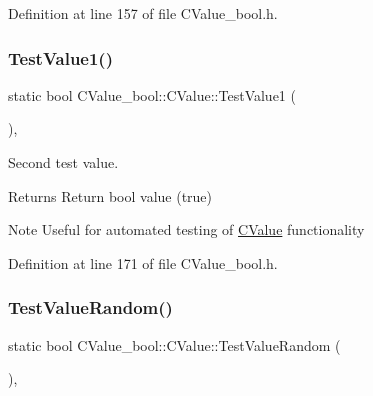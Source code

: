 Definition at line 157 of file C\+Value\+\_\+bool.\+h.

\mbox{\label{class_c_value__bool_1_1_c_value_a73b53a394f0b2ebeebeecad0610949b8}} 
\subsubsection{\texorpdfstring{Test\+Value1()}{TestValue1()}}
{\footnotesize\ttfamily static bool C\+Value\+\_\+bool\+::\+C\+Value\+::\+Test\+Value1 (\begin{DoxyParamCaption}{ }\end{DoxyParamCaption})\hspace{0.3cm}{\ttfamily [inline]}, {\ttfamily [static]}}



Second test value. 

\begin{DoxyReturn}{Returns}
Return {\ttfamily bool} value ({\ttfamily true}) 
\end{DoxyReturn}
\begin{DoxyNote}{Note}
Useful for automated testing of \hyperlink{class_c_value__bool_1_1_c_value}{C\+Value} functionality 
\end{DoxyNote}


Definition at line 171 of file C\+Value\+\_\+bool.\+h.

\mbox{\label{class_c_value__bool_1_1_c_value_a5583585b33adfb3b27d9b49ad1a7cc3a}} 
\subsubsection{\texorpdfstring{Test\+Value\+Random()}{TestValueRandom()}}
{\footnotesize\ttfamily static bool C\+Value\+\_\+bool\+::\+C\+Value\+::\+Test\+Value\+Random (\begin{DoxyParamCaption}{ }\end{DoxyParamCaption})\hspace{0.3cm}{\ttfamily [inline]}, {\ttfamily [static]}}



